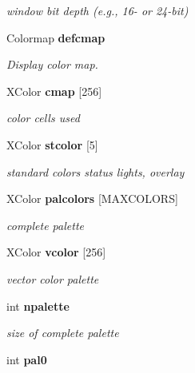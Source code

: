 \begin{CompactItemize}
\begin{CompactList}\small\item\em window bit depth (e.g., 16- or 24-bit) \item\end{CompactList}\item 
Colormap {\bf defcmap}\label{xtvutils_8c_a37}

\begin{CompactList}\small\item\em Display color map. \item\end{CompactList}\item 
XColor {\bf cmap} [256]\label{xtvutils_8c_a38}

\begin{CompactList}\small\item\em color cells used \item\end{CompactList}\item 
XColor {\bf stcolor} [5]\label{xtvutils_8c_a39}

\begin{CompactList}\small\item\em standard colors status lights, overlay \item\end{CompactList}\item 
XColor {\bf palcolors} [MAXCOLORS]\label{xtvutils_8c_a40}

\begin{CompactList}\small\item\em complete palette \item\end{CompactList}\item 
XColor {\bf vcolor} [256]\label{xtvutils_8c_a41}

\begin{CompactList}\small\item\em vector color palette \item\end{CompactList}\item 
int {\bf npalette}\label{xtvutils_8c_a42}

\begin{CompactList}\small\item\em size of complete palette \item\end{CompactList}\item 
int {\bf pal0}\label{xtvutils_8c_a43}


\end{CompactItemize}
